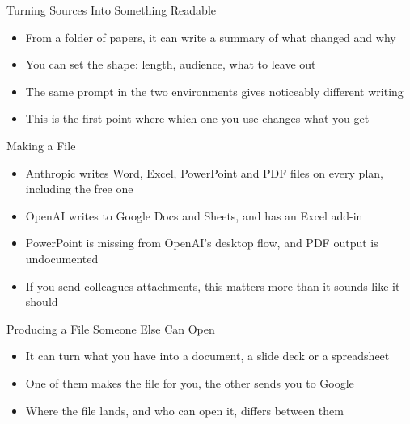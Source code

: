 \documentclass[aspectratio=169]{beamer}
\begin{document}
\begin{frame}{Turning Sources Into Something Readable}
    \begin{itemize}
        \item From a folder of papers, it can write a summary of what changed and why
        \item You can set the shape: length, audience, what to leave out
        \item The same prompt in the two environments gives noticeably different writing
        \item This is the first point where which one you use changes what you get
    \end{itemize}
\end{frame}

\begin{frame}{Making a File}
    \begin{itemize}
        \item Anthropic writes Word, Excel, PowerPoint and PDF files on every plan,
              including the free one
        \item OpenAI writes to Google Docs and Sheets, and has an Excel add-in
        \item PowerPoint is missing from OpenAI's desktop flow, and PDF output is
              undocumented
        \item If you send colleagues attachments, this matters more than it sounds like it
              should
    \end{itemize}
\end{frame}

\begin{frame}{Producing a File Someone Else Can Open}
    \begin{itemize}
        \item It can turn what you have into a document, a slide deck or a spreadsheet
        \item One of them makes the file for you, the other sends you to Google
        \item Where the file lands, and who can open it, differs between them
    \end{itemize}
\end{frame}
\end{document}
